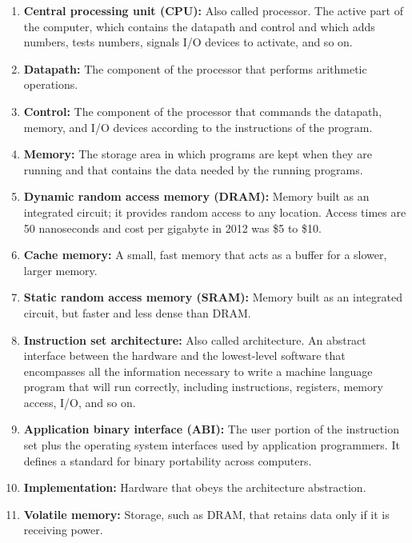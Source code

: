 \begin{enumerate}
    \item \textbf{Central processing unit (CPU):} Also called processor. The active part of the computer, which contains the datapath and control and which adds numbers, tests numbers, signals I/O devices to activate, and so on.
    
    \item \textbf{Datapath:} The component of the processor that performs arithmetic operations.
    
    \item \textbf{Control:} The component of the processor that commands the datapath, memory, and I/O devices according to the instructions of the program.
    
    \item \textbf{Memory:} The storage area in which programs are kept when they are running and that contains the data needed by the running programs.
    
    \item \textbf{Dynamic random access memory (DRAM):} Memory built as an integrated circuit; it provides random access to any location. Access times are 50 nanoseconds and cost per gigabyte in 2012 was \$5 to \$10.
    
    \item \textbf{Cache memory:} A small, fast memory that acts as a buffer for a slower, larger memory.
    
    \item \textbf{Static random access memory (SRAM):} Memory built as an integrated circuit, but faster and less dense than DRAM.
    
    \item \textbf{Instruction set architecture:} Also called architecture. An abstract interface between the hardware and the lowest-level software that encompasses all the information necessary to write a machine language program that will run correctly, including instructions, registers, memory access, I/O, and so on.
    
    \item \textbf{Application binary interface (ABI):} The user portion of the instruction set plus the operating system interfaces used by application programmers. It defines a standard for binary portability across computers.
    
    \item \textbf{Implementation:} Hardware that obeys the architecture abstraction.
    
    \item \textbf{Volatile memory:} Storage, such as DRAM, that retains data only if it is receiving power.
    

\end{enumerate}
